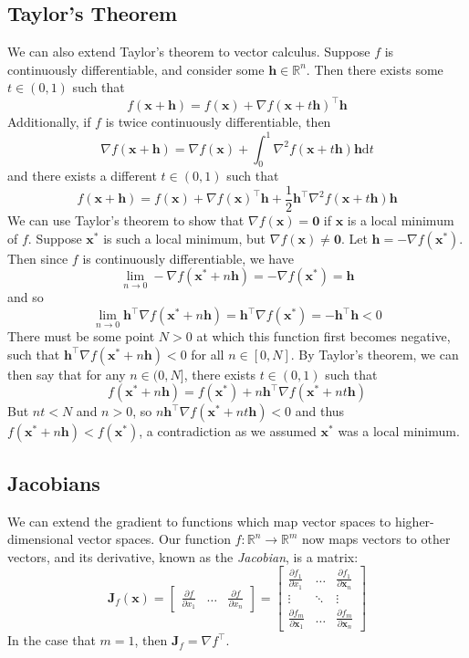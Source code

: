 \documentclass{article}
\begin{document}
\subsection{Taylor's Theorem}
We can also extend Taylor's theorem to vector calculus. Suppose $f$ is continuously differentiable, and consider some $\mathbf{h} \in \mathbb{R}^n$. Then there exists some $t \in (0, 1)$ such that $$f(\mathbf{x + h}) = f(\mathbf{x}) + \nabla f(\mathbf{x} + t\mathbf{h})^\top\mathbf{h}$$ Additionally, if $f$ is twice continuously differentiable, then $$\nabla f(\mathbf{x + h}) = \nabla f(\mathbf{x}) + \int_0^1 \nabla^2 f(\mathbf{x} + t\mathbf{h})\mathbf{h} \text{d}t$$ and there exists a different $t \in (0, 1)$ such that $$f(\mathbf{x + h}) = f(\mathbf{x}) + \nabla f(\mathbf{x})^\top\mathbf{h} + \frac{1}{2}\mathbf{h}^\top\nabla^2 f(\mathbf{x} + t\mathbf{h})\mathbf{h}$$
We can use Taylor's theorem to show that $\nabla f(\mathbf{x}) = \mathbf{0}$ if $\mathbf{x}$ is a local minimum of $f$. Suppose $\mathbf{x^*}$ is such a local minimum, but $\nabla f(\mathbf{x}) \neq \mathbf{0}$. Let $\mathbf{h} = -\nabla f(\mathbf{x^*})$. Then since $f$ is continuously differentiable, we have $$\lim_{n \rightarrow 0} -\nabla f(\mathbf{x^*} + n\mathbf{h}) = -\nabla f(\mathbf{x^*}) = \mathbf{h}$$ and so $$\lim_{n \rightarrow 0}\mathbf{h}^\top \nabla f(\mathbf{x^*} + n\mathbf{h}) = \mathbf{h}^\top\nabla f(\mathbf{x^*}) = -\mathbf{h^\top h} < 0$$ There must be some point $N > 0$ at which this function first becomes negative, such that $\mathbf{h}^\top \nabla f(\mathbf{x^*} + n\mathbf{h}) < 0$ for all $n \in [0, N]$. By Taylor's theorem, we can then say that for any $n \in (0, N]$, there exists $t \in (0, 1)$ such that $$f(\mathbf{x^*} + n\mathbf{h}) = f(\mathbf{x^*}) + n\mathbf{h}^\top\nabla f(\mathbf{x^*} + nt\mathbf{h})$$ But $nt < N$ and $n > 0$, so $n\mathbf{h}^\top\nabla f(\mathbf{x^*} + nt\mathbf{h}) < 0$ and thus $f(\mathbf{x^*} + n\mathbf{h}) < f(\mathbf{x^*})$, a contradiction as we assumed $\mathbf{x^*}$ was a local minimum.

\subsection{Jacobians}
We can extend the gradient to functions which map vector spaces to higher-dimensional vector spaces. Our function $f: \mathbb{R}^n \rightarrow \mathbb{R}^m$ now maps vectors to other vectors, and its derivative, known as the \textit{Jacobian}, is a matrix: $$\mathbf{J}_f(\mathbf{x}) = \begin{bmatrix} \frac{\partial f}{\partial x_1} & \hdots & \frac{\partial f}{\partial x_n} \end{bmatrix} = \begin{bmatrix} \frac{\partial f_1}{\partial x_1} & \hdots & \frac{\partial f_1}{\partial \mathbf{x}_n} \\ \vdots & \ddots & \vdots \\ \frac{\partial f_m}{\partial \mathbf{x}_1} & \hdots & \frac{\partial f_m}{\partial \mathbf{x}_n} \end{bmatrix}$$ In the case that $m = 1$, then $\mathbf{J}_f = \nabla f^{\top}$.
\end{document}
